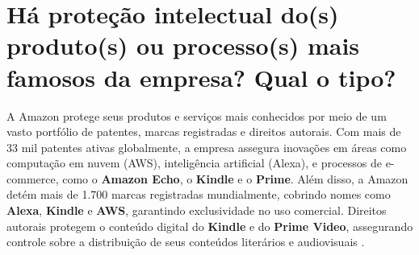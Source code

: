 \section{Há proteção intelectual do(s) produto(s) ou processo(s) mais famosos da empresa? Qual o tipo?}
A Amazon protege seus produtos e serviços mais conhecidos por meio de um vasto portfólio de patentes, marcas registradas e direitos autorais. Com mais de 33 mil patentes ativas globalmente, a empresa assegura inovações em áreas como computação em nuvem (AWS), inteligência artificial (Alexa), e processos de e-commerce, como o \textbf{Amazon Echo}, o \textbf{Kindle} e o \textbf{Prime}. Além disso, a Amazon detém mais de 1.700 marcas registradas mundialmente, cobrindo nomes como \textbf{Alexa}, \textbf{Kindle} e \textbf{AWS}, garantindo exclusividade no uso comercial. Direitos autorais protegem o conteúdo digital do \textbf{Kindle} e do \textbf{Prime Video}, assegurando controle sobre a distribuição de seus conteúdos literários e audiovisuais \cite{amazonPatents2024}.